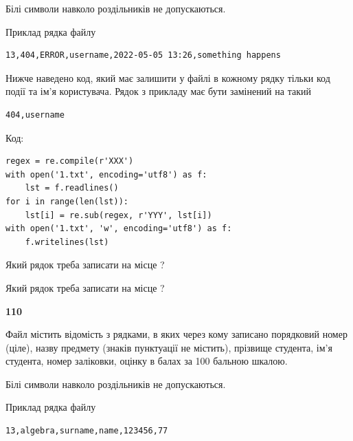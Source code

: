 Білі символи навколо роздільників не допускаються.

Приклад рядка файлу



\begin{verbatim}
13,404,ERROR,username,2022-05-05 13:26,something happens
\end{verbatim}


Нижче наведено код, який має залишити у файлі в кожному рядку тільки код події та ім'я користувача. Рядок з прикладу має бути замінений на такий



\begin{verbatim}
404,username
\end{verbatim}




Код:



\begin{verbatim}
regex = re.compile(r'XXX')
with open('1.txt', encoding='utf8') as f:
    lst = f.readlines()
for i in range(len(lst)):
    lst[i] = re.sub(regex, r'YYY', lst[i])
with open('1.txt', 'w', encoding='utf8') as f:
    f.writelines(lst)
\end{verbatim}







Який рядок треба записати на місце  ?\par
\vspace{5mm}


Який рядок треба записати на місце  ?\par


\newpage

{\begin {center}\textbf{ 110}\end {center}}\par
Файл  містить відомість з рядками, в яких через кому записано поряд\-ковий номер (ціле), назву предмету (знаків пунктуації не містить), прізвище студента, ім'я студента, номер заліковки, оцінку в балах за 100 бальною шкалою.

Білі символи навколо роздільників не допускаються.

Приклад рядка файлу



\begin{verbatim}
13,algebra,surname,name,123456,77
\end{verbatim}


